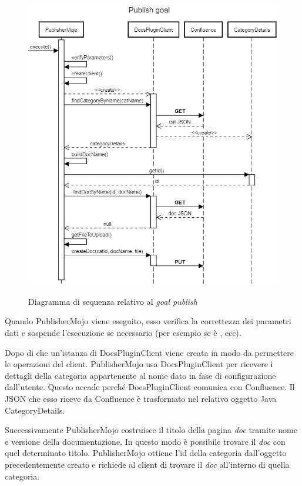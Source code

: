 \begin{figure}[H]
    \centering
    \includegraphics[width=\textwidth]{immagini/SeqPublish.png}\\
    \caption{Diagramma di sequenza relativo al \emph{goal publish}}
\end{figure}

Quando PublisherMojo viene eseguito, esso verifica la correttezza dei parametri dati e sospende l'esecuzione se necessario (per esempio se  è , ecc).

Dopo di che un'istanza di DocsPluginClient viene creata in modo da permettere le operazioni del client.
PublisherMojo usa DocsPluginClient per ricevere i dettagli della categoria appartenente al nome dato in fase di configurazione dall'utente.
Questo accade perché DocsPluginClient comunica con Confluence.
Il JSON che esso riceve da Confluence è trasformato nel relativo oggetto Java CategoryDetails.

Successivamente PublisherMojo costruisce il titolo della pagina \emph{doc} tramite nome e versione della documentazione.
In questo modo è possibile trovare il \emph{doc} con quel determinato titolo.
PublisherMojo ottiene l'id della categoria dall'oggetto precedentemente creato e richiede al client di trovare il \emph{doc} all'interno di quella categoria.

